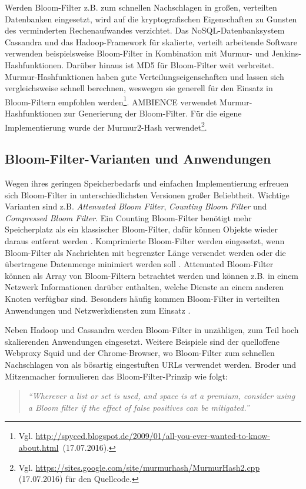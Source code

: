 Werden Bloom-Filter z.B. zum schnellen Nachschlagen in großen, verteilten Datenbanken eingesetzt, wird auf die kryptografischen Eigenschaften zu Gunsten des verminderten Rechenaufwandes verzichtet. Das NoSQL-Datenbanksystem Cassandra und das Hadoop-Framework für skalierte, verteilt arbeitende Software verwenden beispielsweise Bloom-Filter in Kombination mit Murmur- und Jenkins-Hashfunktionen. Darüber hinaus ist MD5 für Bloom-Filter weit verbreitet. Murmur-Hashfunktionen haben gute Verteilungseigenschaften und lassen sich vergleichsweise schnell berechnen, weswegen sie generell für den Einsatz in Bloom-Filtern empfohlen werden\footnote{Vgl. \mbox{\url{http://spyced.blogspot.de/2009/01/all-you-ever-wanted-to-know-about.html} (17.07.2016).}}. AMBIENCE verwendet Murmur-Hashfunktionen zur Generierung der Bloom-Filter. Für die eigene Implementierung wurde der Murmur2-Hash verwendet\footnote{Vgl. \url{https://sites.google.com/site/murmurhash/MurmurHash2.cpp} (17.07.2016) für den Quellcode.}.  
\subsection{Bloom-Filter-Varianten und Anwendungen}\label{sec:bloom-anwendungen}
Wegen ihres geringen Speicherbedarfs und einfachen Implementierung erfreuen sich Bloom-Filter in unterschiedlichsten Versionen großer Beliebtheit. Wichtige Varianten sind z.B. \textit{Attenuated Bloom Filter}, \textit{Counting Bloom Filter} und \textit{Compressed Bloom Filter}. Ein Counting Bloom-Filter benötigt mehr Speicherplatz als ein klassischer Bloom-Filter, dafür können Objekte wieder daraus entfernt werden \cite{Fan2000}. Komprimierte Bloom-Filter werden eingesetzt, wenn Bloom-Filter als Nachrichten mit begrenzter Länge versendet werden oder die übertragene Datenmenge minimiert werden soll \cite{Mitzenmacher2002}. Attenuated Bloom-Filter \cite{Sakuma2011} können als Array von Bloom-Filtern betrachtet werden und können z.B. in einem Netzwerk Informationen darüber enthalten, welche Dienste an einem anderen Knoten verfügbar sind. Besonders häufig kommen Bloom-Filter in verteilten Anwendungen und Netzwerkdiensten zum Einsatz \cite{Broder2004}. 

Neben Hadoop und Cassandra werden Bloom-Filter in unzähligen, zum Teil hoch skalierenden Anwendungen eingesetzt. Weitere Beispiele sind der quelloffene Webproxy Squid und der Chrome-Browser, wo Bloom-Filter zum schnellen Nachschlagen von als bösartig eingestuften URLs verwendet werden. Broder und Mitzenmacher formulieren das Bloom-Filter-Prinzip wie folgt: 
\begin{quote}
\textit{"`Wherever a list or set is used, and space is at a premium, consider using a Bloom filter if the effect of false positives can be mitigated."'} \cite{Broder2004}
\end{quote}
